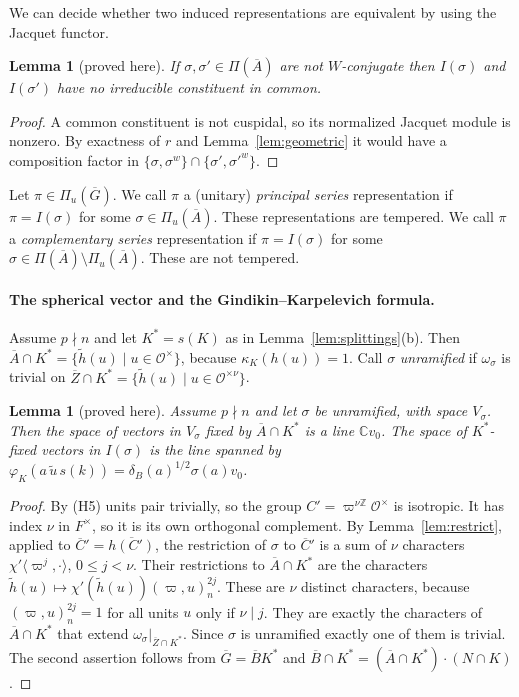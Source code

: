 \documentclass[12pt,letterpaper]{article}
\numberwithin{equation}{section}
\newtheorem{lemma}[theorem]{Lemma}
\newtheorem{xlemma}[theorem]{Lemma}
\theoremstyle{definition}
\newcommand{\proved}{proved here}
\newcommand{\C}{\mathbb C}
\newcommand{\Z}{\mathbb Z}
\newcommand{\OF}{\mathcal O}
\newcommand{\vp}{\varpi}
\newcommand{\bG}{\overline{G}}
\newcommand{\bA}{\overline{A}}
\newcommand{\bB}{\overline{B}}
\newcommand{\bC}{\overline{C}}
\newcommand{\bZ}{\overline{Z}}
\newcommand{\hl}{\tilde h}
\newcommand{\Piu}{\Pi_{u}(\bG)}
\begin{document}
We can decide whether two induced representations are equivalent by using the Jacquet
functor.

\begin{lemma}[\proved]\label{lem:inequiv}
If $\sigma,\sigma'\in\Pi(\bA)$ are not $W$-conjugate then $I(\sigma)$ and $I(\sigma')$ have
no irreducible constituent in common.
\end{lemma}
\begin{proof}
A common constituent is not cuspidal, so its normalized Jacquet module is nonzero.  By
exactness of $r$ and Lemma~\ref{lem:geometric} it would have a composition factor in
$\{\sigma,\sigma^w\}\cap\{\sigma',\sigma'^w\}$.
\end{proof}

Let $\pi\in\Piu$.  We call $\pi$ a (unitary) \emph{principal series} representation if
$\pi=I(\sigma)$ for some $\sigma\in\Pi_u(\bA)$.  These representations are tempered.  We call
$\pi$ a \emph{complementary series} representation if $\pi=I(\sigma)$ for some
$\sigma\in\Pi(\bA)\setminus\Pi_u(\bA)$.  These are not tempered.

\paragraph{The spherical vector and the Gindikin--Karpelevich formula.}
Assume $p\nmid n$ and let $K^*=s(K)$ as in Lemma~\ref{lem:splittings}(b).  Then
$\bA\cap K^*=\{\hl(u)\mid u\in\OF^\times\}$, because $\kappa_K(h(u))=1$.  Call $\sigma$
\emph{unramified} if $\omega_\sigma$ is trivial on $\bZ\cap K^*=\{\hl(u)\mid u\in\OF^{\times\nu}\}$.

\begin{xlemma}[\proved]\label{lem:spherical}
Assume $p\nmid n$ and let $\sigma$ be unramified, with space $V_\sigma$.  Then the space of
vectors in $V_\sigma$ fixed by $\bA\cap K^*$ is a line $\C v_0$.  The space of $K^*$-fixed
vectors in $I(\sigma)$ is the line spanned by
$\varphi_K(a\,\tilde u\,s(k))=\delta_B(a)^{1/2}\sigma(a)v_0$.
\end{xlemma}
\begin{proof}
By (H5) units pair trivially, so the group $C'=\vp^{\nu\Z}\OF^\times$ is isotropic.  It has
index $\nu$ in $F^\times$, so it is its own orthogonal complement.  By
Lemma~\ref{lem:restrict}, applied to $\bC'=\overline{h(C')}$, the restriction of $\sigma$ to
$\bC'$ is a sum of $\nu$ characters $\chi'\langle\vp^j,\cdot\rangle$, $0\le j<\nu$.  Their
restrictions to $\bA\cap K^*$ are the characters
$\hl(u)\mapsto\chi'(\hl(u))(\vp,u)_n^{2j}$.  These are $\nu$ distinct characters, because
$(\vp,u)_n^{2j}=1$ for all units $u$ only if $\nu\mid j$.  They are exactly the characters of
$\bA\cap K^*$ that extend $\omega_\sigma|_{\bZ\cap K^*}$.  Since $\sigma$ is unramified exactly one of them is
trivial.  The second assertion follows from $\bG=\bB K^*$ and
$\bB\cap K^*=(\bA\cap K^*)\cdot(N\cap K)$.
\end{proof}
\end{document}
